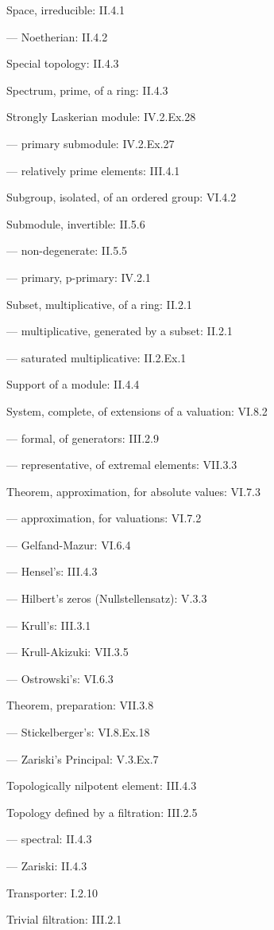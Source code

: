 Space, irreducible: II.4.1

--- Noetherian: II.4.2

Special topology: II.4.3

Spectrum, prime, of a ring: II.4.3

Strongly Laskerian module: IV.2.Ex.28

--- primary submodule: IV.2.Ex.27

--- relatively prime elements: III.4.1

Subgroup, isolated, of an ordered group: VI.4.2

Submodule, invertible: II.5.6

--- non-degenerate: II.5.5

--- primary, p-primary: IV.2.1

Subset, multiplicative, of a ring: II.2.1

--- multiplicative, generated by a subset: II.2.1

--- saturated multiplicative: II.2.Ex.1

Support of a module: II.4.4

System, complete, of extensions of a valuation: VI.8.2

--- formal, of generators: III.2.9

--- representative, of extremal elements: VII.3.3

Theorem, approximation, for absolute values: VI.7.3

--- approximation, for valuations: VI.7.2

--- Gelfand-Mazur: VI.6.4

--- Hensel's: III.4.3

--- Hilbert's zeros (Nullstellensatz): V.3.3

--- Krull's: III.3.1

--- Krull-Akizuki: VII.3.5

--- Ostrowski's: VI.6.3

Theorem, preparation: VII.3.8

--- Stickelberger's: VI.8.Ex.18

--- Zariski's Principal: V.3.Ex.7

Topologically nilpotent element: III.4.3

Topology defined by a filtration: III.2.5

--- spectral: II.4.3

--- Zariski: II.4.3

Transporter: I.2.10

Trivial filtration: III.2.1

